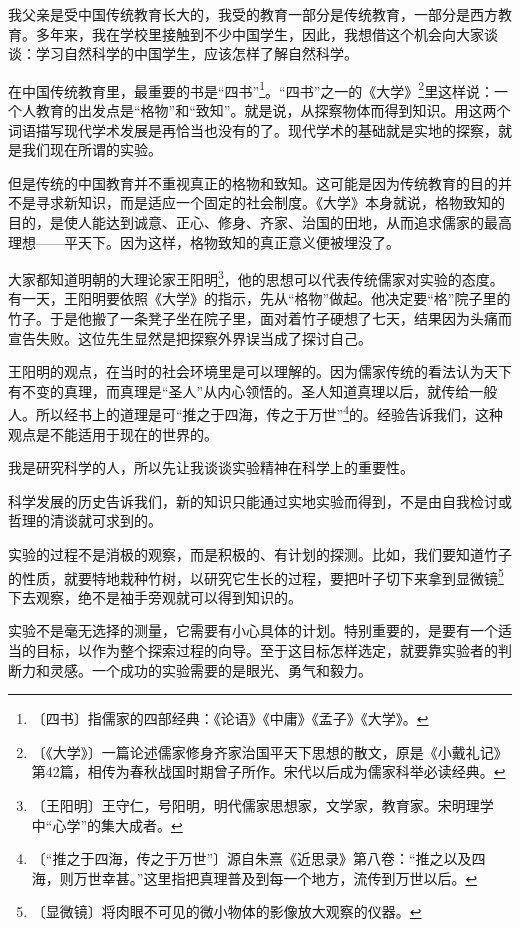 \documentclass[12pt,UTF-8,openany]{ctexbook}
\begin{document}
\begin{large}
    
    我父亲是受中国传统教育长大的，我受的教育一部分是传统教育，一部分是西方教育。多年来，我在学校里接触到不少中国学生，因此，我想借这个机会向大家谈谈：学习自然科学的中国学生，应该怎样了解自然科学。
    
    在中国传统教育里，最重要的书是“四书”\footnote{〔四书〕指儒家的四部经典：《论语》《中庸》《孟子》《大学》。}。“四书”之一的《大学》\footnote{〔《大学》〕一篇论述儒家修身齐家治国平天下思想的散文，原是《小戴礼记》第42篇，相传为春秋战国时期曾子所作。宋代以后成为儒家科举必读经典。}里这样说：一个人教育的出发点是“格物”和“致知”。就是说，从探察物体而得到知识。用这两个词语描写现代学术发展是再恰当也没有的了。现代学术的基础就是实地的探察，就是我们现在所谓的实验。
    
    但是传统的中国教育并不重视真正的格物和致知。这可能是因为传统教育的目的并不是寻求新知识，而是适应一个固定的社会制度。《大学》本身就说，格物致知的目的，是使人能达到诚意、正心、修身、齐家、治国的田地，从而追求儒家的最高理想——平天下。因为这样，格物致知的真正意义便被埋没了。
    
    大家都知道明朝的大理论家王阳明\footnote{〔王阳明〕王守仁，号阳明，明代儒家思想家，文学家，教育家。宋明理学中“心学”的集大成者。}，他的思想可以代表传统儒家对实验的态度。有一天，王阳明要依照《大学》的指示，先从“格物”做起。他决定要“格”院子里的竹子。于是他搬了一条凳子坐在院子里，面对着竹子硬想了七天，结果因为头痛而宣告失败。这位先生显然是把探察外界误当成了探讨自己。
    
    王阳明的观点，在当时的社会环境里是可以理解的。因为儒家传统的看法认为天下有不变的真理，而真理是“圣人”从内心领悟的。圣人知道真理以后，就传给一般人。所以经书上的道理是可“推之于四海，传之于万世”\footnote{〔“推之于四海，传之于万世”〕源自朱熹《近思录》第八卷：“推之以及四海，则万世幸甚。”这里指把真理普及到每一个地方，流传到万世以后。}的。经验告诉我们，这种观点是不能适用于现在的世界的。
    
    我是研究科学的人，所以先让我谈谈实验精神在科学上的重要性。
    
    科学发展的历史告诉我们，新的知识只能通过实地实验而得到，不是由自我检讨或哲理的清谈就可求到的。
    
    实验的过程不是消极的观察，而是积极的、有计划的探测。比如，我们要知道竹子的性质，就要特地栽种竹树，以研究它生长的过程，要把叶子切下来拿到显微镜\footnote{〔显微镜〕将肉眼不可见的微小物体的影像放大观察的仪器。}下去观察，绝不是袖手旁观就可以得到知识的。
    
    实验不是毫无选择的测量，它需要有小心具体的计划。特别重要的，是要有一个适当的目标，以作为整个探索过程的向导。至于这目标怎样选定，就要靠实验者的判断力和灵感。一个成功的实验需要的是眼光、勇气和毅力。
    

\end{large}
\end{document}
